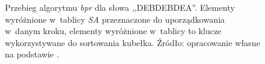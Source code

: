 \begin{figure}[t]
    \caption{Przebieg algorytmu \emph{bpr} dla słowa ,,DEBDEBDEA''. Elementy
    wyróżnione w~tablicy \emph{SA} przeznaczone do uporządkowania w~danym
    kroku, elementy wyróżnione w~tablicy \ISA{} to klucze wykorzystywane 
   do sortowania kubełka. Źródło: opracowanie własne na podstawie
   \cite{schurmann-phd}.}\label{rys:bpr}
\end{figure}

